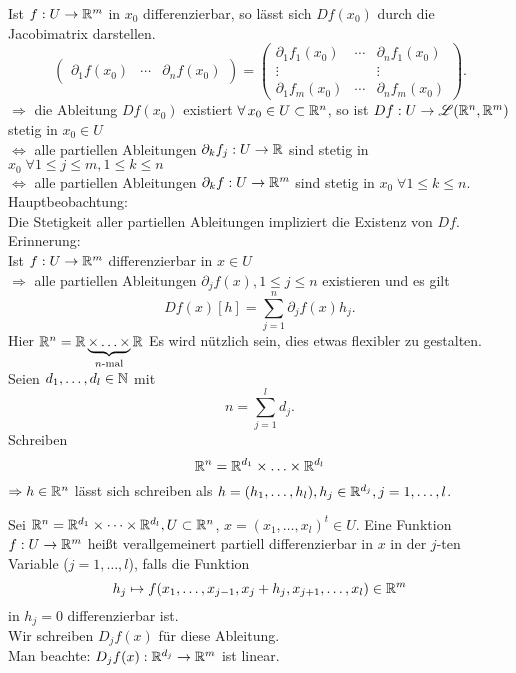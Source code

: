 \documentclass[../ana2.tex]{subfiles}
\begin{document}
Ist \(f:U\rightarrow \mathbb{R}^m \) in \(x_0\) differenzierbar, so lässt 
sich \(Df(x_0)\) durch die Jacobimatrix darstellen.
\[ \begin{pmatrix}
    \partial_1 f(x_0) & \cdots & \partial_n f(x_0)
\end{pmatrix} = \begin{pmatrix}
    \partial_1 f_1(x_0) & \cdots & \partial_n f_1(x_0) \\
    \vdots && \vdots \\
    \partial_1 f_m(x_0) & \cdots & \partial_n f_m(x_0)
\end{pmatrix}. \]
\( \Rightarrow \) die Ableitung \( Df(x_0) \) existiert 
\( \forall x_0 \in U \subset \R^n \), so ist 
\( Df:U\rightarrow \mathscr{L}(\mathbb{R}^n, \mathbb{R}^m) \) 
stetig in \( x_0 \in U \) \\
\( \Leftrightarrow \) alle partiellen Ableitungen 
\( \partial_k f_j:U\rightarrow \mathbb{R} \) sind stetig in 
\(x_0 \; \forall 1 \leq j \leq m, 1 \leq k \leq n \) \\
\( \Leftrightarrow \) alle partiellen Ableitungen 
\( \partial_k f:U\rightarrow \mathbb{R}^m \)
sind stetig in \(x_0 \; \forall 1 \leq k \leq n\).
Hauptbeobachtung:\\
Die Stetigkeit aller partiellen Ableitungen 
impliziert die Existenz von \(Df\).\\
Erinnerung: \\
Ist \(f:U\rightarrow \mathbb{R}^m\)
differenzierbar in \( x\in U \)\\
\( \Rightarrow \) alle partiellen Ableitungen 
\( \partial_j f(x), 1 \leq j \leq n \) existieren
und es gilt
\[ Df(x)[h] = \sum_{j=1}^n \partial_j f(x) h_j. \]
Hier \( \mathbb{R}^n = \mathbb{R} \underbrace{\times \ldots \times}_{n\text{-mal}} \mathbb{R} \)
Es wird nützlich sein, dies etwas flexibler zu 
gestalten.\\
Seien \( d_1, \ldots, d_l \in \mathbb{N} \) mit
\[ n = \sum_{j=1}^l d_j. \]
Schreiben 
\[ \mathbb{R}^n = \mathbb{R}^{d_1} \times \ldots \times \mathbb{R}^{d_l} \]
\( \Rightarrow h \in \mathbb{R}^n \) lässt sich schreiben
als \( h = (h_1,\ldots, h_l), h_j \in \mathbb{R}^{d_j}, j=1,\ldots,l \).
\begin{defi}
    Sei \( \mathbb{R}^n = \mathbb{R}^{d_1} \times \dots \times \mathbb{R}^{d_l}, U \subset \mathbb{R}^n \),
    \( x = (x_1, \ldots, x_l)^t \in U \).
    Eine Funktion \( f:U\rightarrow \mathbb{R}^m \) heißt verallgemeinert
    partiell differenzierbar in \(x\) in der \(j\)-ten 
    Variable (\(j = 1, \ldots, l\)), falls die Funktion 
    \[ h_j \mapsto f(x_1,\ldots, x_{j-1}, x_j + h_j, 
    x_{j+1}, \ldots, x_l) \in \mathbb{R}^m \] 
    in \( h_j = 0 \) differenzierbar ist.\\
    Wir schreiben \(D_jf(x)\) für diese Ableitung.\\
    Man beachte: \( D_jf(x):\mathbb{R}^{d_j}\rightarrow \mathbb{R}^m \) ist linear.
\end{defi}
\end{document}
